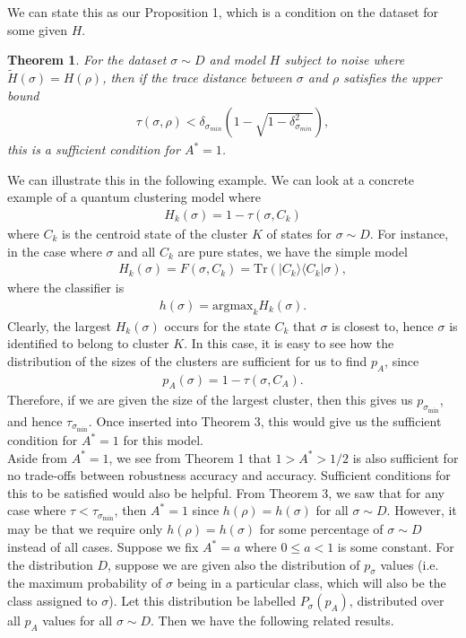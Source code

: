 \documentclass[onecolumn,prx, superscriptaddress,longbibliography,margin=1mm 11pt]{revtex4-2}
\newtheorem{theorem}{Theorem}
\begin{document}
We can state this as our Proposition 1, which is a condition on the dataset for some given $H$.\\

\begin{theorem} For the dataset $\sigma \sim D$ and model $H$ subject to noise where $\tilde{H}(\sigma)=H(\rho)$, then if the trace distance between $\sigma$ and $\rho$ satisfies the upper bound 
\begin{align}
     \tau (\sigma, \rho)<\delta_{\sigma_{min}}(1-\sqrt{1-\delta_{\sigma_{min}}^2}),
\end{align}
this is a sufficient condition for $A^*=1$. 
\end{theorem}

We can illustrate this in the following example. We can look at a concrete example of a quantum clustering model where 
\begin{align}
    H_k(\sigma)=1-\tau(\sigma, C_k)
\end{align}
where $C_k$ is the centroid state of the cluster $K$ of states for $\sigma \sim D$. For instance, in the case where $\sigma$ and all $C_k$ are pure states, we have the simple model
\begin{align}
    H_k(\sigma)=F(\sigma, C_k)=\text{Tr}(|C_k\rangle \langle C_k| \sigma),
\end{align}
where the classifier is
\begin{align}
    h(\sigma)=\text{argmax}_k H_k(\sigma).
\end{align}
Clearly, the largest $H_k(\sigma)$ occurs for the state $C_k$ that $\sigma$ is closest to, hence $\sigma$ is identified to belong to cluster $K$. In this case, it is easy to see how the distribution of the sizes of the clusters are sufficient for us to find $p_A$, since 
\begin{align}
    p_A(\sigma)=1-\tau(\sigma, C_A).
\end{align}
Therefore, if we are given the size of the largest cluster, then this gives us $p_{\sigma_{\min}}$, and hence $\tau_{\sigma_{\min}}$. Once inserted into Theorem 3, this would give us the sufficient condition for $A^*=1$ for this model. \\

Aside from $A^*=1$, we see from Theorem 1 that $1>A^*>1/2$ is also sufficient for no trade-offs between robustness accuracy and accuracy. Sufficient conditions for this to be satisfied would also be helpful. From Theorem 3, we saw that for any case where $\tau<\tau_{\sigma_{\min}}$, then $A^*=1$ since $h(\rho)=h(\sigma)$ for all $\sigma \sim D$. However, it may be that we require only $h(\rho)=h(\sigma)$ for some percentage of $\sigma \sim D$ instead of all cases. Suppose we fix $A^*=a$ where $0 \leq a<1$ is some constant. For the distribution $D$, suppose we are given also the distribution of $p_{\sigma}$ values (i.e. the maximum probability of $\sigma$ being in a particular class, which will also be the class assigned to $\sigma$). Let this distribution be labelled $P_{\sigma}(p_A)$, distributed over all $p_A$ values for all $\sigma \sim D$. Then we have the following related results. \\
\end{document}
